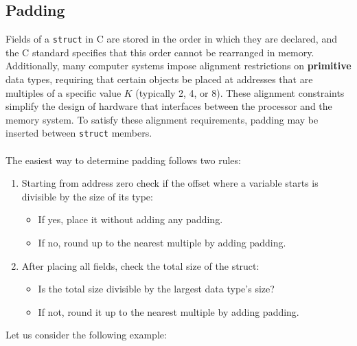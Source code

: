 \subsection{Padding}
%
Fields of a \texttt{struct} in C are stored in the order in which they are 
declared, and the C standard specifies that this order cannot be rearranged 
in memory. Additionally, many computer systems impose alignment restrictions 
on \textbf{primitive} data types, requiring that certain objects be placed at 
addresses that are multiples of a specific value \( K \) (typically 2, 4, or 8). 
These alignment constraints simplify the design of hardware that interfaces 
between the processor and the memory system. To satisfy these alignment requirements, 
padding may be inserted between \texttt{struct} members. \\
\\
%
\clearpage
%
The easiest way to determine padding follows two rules:
%
\begin{enumerate}
    \item Starting from address zero check if the offset where a variable 
    starts is divisible by the size of its type:
    \begin{itemize}
        \item If yes, place it without adding any padding.
        \item If no, round up to the nearest multiple by adding padding.
    \end{itemize}
    
    \item After placing all fields, check the total size of the struct:
    \begin{itemize}
        \item Is the total size divisible by the largest data type's size?
        \item If not, round it up to the nearest multiple by adding padding.
    \end{itemize}
\end{enumerate}

Let us consider the following example:

